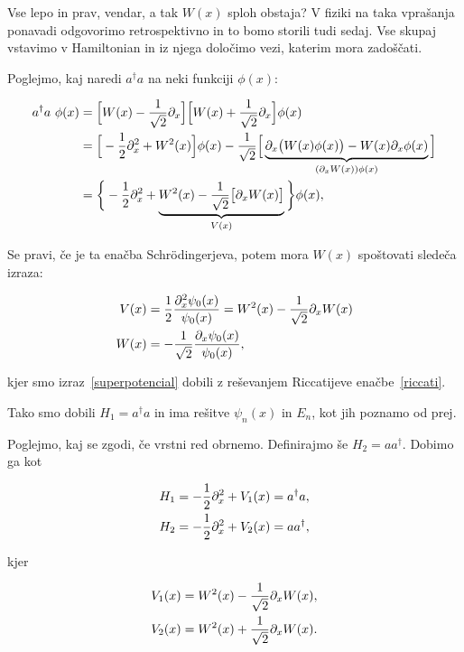 Vse lepo in prav, vendar, a tak $W (x)$ sploh obstaja? V fiziki na taka vpra\v sanja ponavadi odgovorimo
retrospektivno in to bomo storili tudi sedaj. Vse skupaj vstavimo v Hamiltonian in iz njega dolo\v cimo
vezi, katerim mora zado\v s\v cati.

Poglejmo, kaj naredi $a^\dagger a$ na neki funkciji $\phi (x)$:

\begin{align}
	a^\dagger a\ \phi(x)&= \Big[W(x) - \frac{1}{\sqrt{2}}\partial_x\Big]\Big[W(x) +
		\frac{1}{\sqrt{2}}\partial_x\Big]\phi(x) \notag \\
	&= \Big[-\frac{1}{2}\partial_x^2 + W^2(x)\Big]\phi(x) - \frac{1}{\sqrt{2}}\Big[
		\underbrace{\partial_x \big(W(x)\phi(x)\big) - W(x)\partial_x\phi(x)}_{(\partial_x W(x))\phi(x)} \Big] \notag \\
	&= \bigg\{-\frac{1}{2}\partial_x^2 +
		\underbrace{W^2(x) - \frac{1}{\sqrt{2}}\big[\partial_x W(x)\big]}_{V(x)}\bigg\}\phi(x),
	\label{dokaz.aad}
\end{align}

Se pravi, \v ce je ta ena\v cba Schr\" odingerjeva, potem mora $W (x)$ spo\v stovati slede\v ca izraza:

\begin{align}
	V(x) &=\frac{1}{2}\frac{\partial_x^2\psi_0(x)}{\psi_0(x)} = W^2(x) - \frac{1}{\sqrt{2}}\partial_x
		W(x) \label{riccati} \\
	W(x) &= -\frac{1}{\sqrt{2}}\frac{\partial_x\psi_0(x)}{\psi_0(x)} \label{superpotencial},
\end{align}

kjer smo izraz~\eqref{superpotencial} dobili z re\v sevanjem Riccatijeve ena\v cbe~\eqref{riccati}.

Tako smo dobili $H_1 = a^\dagger a$ in ima re\v sitve $\psi_n(x)$ in $E_n$, kot jih poznamo
od prej.

Poglejmo, kaj se zgodi, \v ce vrstni red obrnemo. Definirajmo \v se $H_2 = aa^\dagger$. Dobimo ga kot

\begin{align}
	H_1 &= -\frac{1}{2}\partial_x^2 + V_1(x) = a^\dagger a, \\
	H_2 &= -\frac{1}{2}\partial_x^2 + V_2(x) = aa^\dagger,
\end{align}

kjer

\begin{align}
	V_1(x) &= W^2(x) - \frac{1}{\sqrt{2}}\partial_x W(x), \\
	V_2(x) &= W^2(x) + \frac{1}{\sqrt{2}}\partial_x W(x). \label{v2pot}
\end{align}

